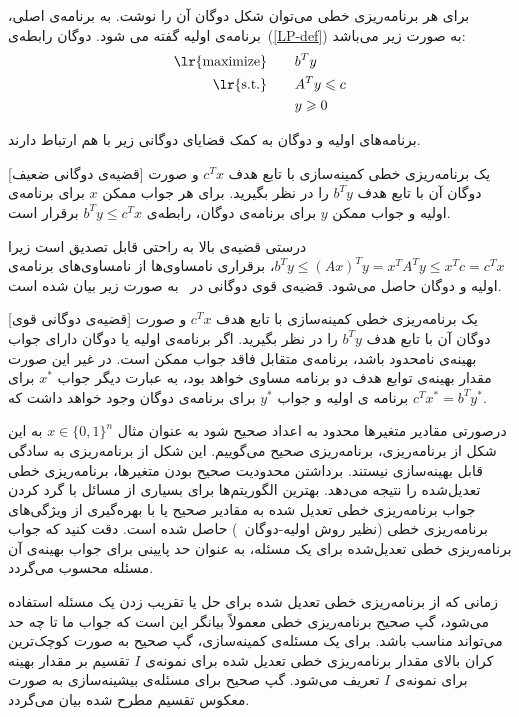 برای هر برنامه‌ریزی خطی می‌توان شکل دوگان آن را نوشت. به برنامه‌ی اصلی، برنامه‌ی اولیه گفته  می شود. دوگان رابطه‌ی~(\ref{LP-def}) به صورت زیر می‌باشد:
\begin{alignat}{3}
\text{\lr{maximize}}   & \quad &&    b^T y           \label{DUAL-def}  \\
\text{\lr{s.t.}}          &  &&    A^T y \leq c  \notag  \\
                       &  &&	y \geq 0        \notag 
\end{alignat}

برنامه‌های اولیه و دوگان به کمک قضایای دوگانی زیر با هم ارتباط دارند.


[قضیه‌ی دوگانی ضعیف] 
یک برنامه‌ریزی خطی کمینه‌سازی با تابع هدف $c^T x$ و صورت دوگان آن با تابع هدف $b^T y$ را در نظر بگیرید. برای هر جواب ممکن $x$ برای برنامه‌ی اولیه و جواب ممکن $y$ برای برنامه‌ی دوگان، رابطه‌ی  $b^T y \leq c^T x$ برقرار است.

درستی قضیه‌ی بالا به راحتی قابل تصدیق است زیرا $b^T y \leq (Ax)^T y = x^T A^T y \leq x^T c = c^T x$، برقراری نامساوی‌ها از نامساوی‌های برنامه‌‌ی اولیه و دوگان حاصل می‌شود. قضیه‌ی قوی دوگانی در~\cite{N47} به صورت زیر بیان شده است.


[قضیه‌ی دوگانی قوی] 
یک برنامه‌ریزی خطی کمینه‌سازی با تابع هدف $c^T x$ و صورت دوگان آن با تابع هدف $b^T y$ را در نظر بگیرید. اگر برنامه‌ی اولیه یا دوگان دارای جواب بهینه‌ی نامحدود باشد، برنامه‌ی متقابل فاقد جواب ممکن است. در غیر این صورت مقدار بهینه‌ی توابع هدف دو برنامه مساوی خواهد بود، به عبارت دیگر جواب $x^*$ برای برنامه ی اولیه و جواب $y^*$  برای برنامه‌ی دوگان وجود خواهد داشت که $c^T x^* = b^T y^*$.
 
درصورتی مقادیر متغیر‌ها محدود به اعداد صحیح شود به عنوان مثال $x \in \{0, 1\}^n$ به این شکل از برنامه‌ریزی،  برنامه‌ریزی صحیح می‌گوییم. این شکل از برنامه‌ریزی به سادگی قابل بهینه‌سازی نیستند. برداشتن محدودیت صحیح بودن متغیرها، برنامه‌ریزی خطی تعدیل‌شده را نتیجه می‌دهد. بهترین الگوریتم‌ها برای بسیاری از مسائل با گرد کردن جواب برنامه‌ریزی خطی تعدیل شده به مقادیر صحیح یا با بهره‌گیری از ویژگی‌های برنامه‌ریزی خطی 
(نظیر روش اولیه-دوگان~\cite{ISAAC12}) حاصل شده است. 
دقت کنید که جواب برنامه‌ریزی خطی تعدیل‌شده برای یک مسئله، به عنوان حد پایینی برای جواب بهینه‌ی آن مسئله محسوب می‌گردد.

زمانی که از برنامه‌ریزی خطی تعدیل شده برای حل یا تقریب زدن یک مسئله استفاده می‌شود، گپ صحیح برنامه‌ریزی خطی معمولاً بیانگر این است که جواب ما تا چه حد می‌تواند مناسب باشد. برای یک مسئله‌ی کمینه‌سازی، گپ صحیح به صورت 
کوچک‌ترین کران بالای مقدار برنامه‌ریزی خطی تعدیل شده برای نمونه‌ی $I$ تقسیم بر مقدار بهینه‌ برای نمونه‌ی $I$
تعریف می‌شود.
گپ صحیح برای مسئله‌ی بیشینه‌سازی به صورت معکوس تقسیم مطرح شده بیان می‌گردد.

